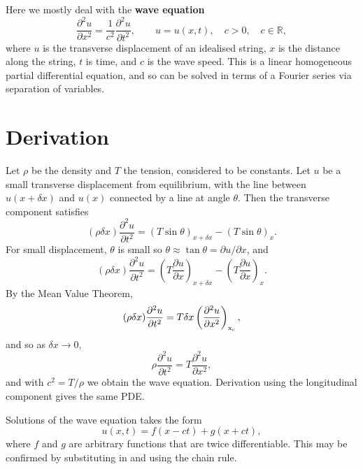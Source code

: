 \documentclass[letter-paper]{tufte-book}
\newcommand{\dy}{\partial}
\newcommand{\ddy}[2]{\frac{\dy#1}{\dy#2}}
\newcommand\Def[1]{\textbf{#1}}
\begin{document}
Here we mostly deal with the \Def{wave equation}
\begin{equation*}
  \ddy{^2 u}{x^2} = \frac{1}{c^2} \ddy{^2 u}{t^2}, 
    \qquad u = u(x,t), \quad c > 0, \quad c \in \mathbb{R},
\end{equation*}
where $u$ is the transverse displacement of an idealised string, $x$ is the
distance along the string, $t$ is time, and $c$ is the wave speed. This is a
linear homogeneous partial differential equation, and so can be solved in terms
of a Fourier series via separation of variables.


\section{Derivation}

Let $\rho$ be the density and $T$ the tension, considered to be constants. Let
$u$ be a small transverse displacement from equilibrium, with the line between
$u(x + \delta x)$ and $u(x)$ connected by a line at angle $\theta$. Then the
transverse component satisfies
\begin{equation*}
  (\rho \delta x) \ddy{^2 u}{t^2} = 
    (T \sin \theta)_{x + \delta x} - (T \sin \theta)_{x}.
\end{equation*}
For small displacement, $\theta$ is small so $\theta \approx \tan\theta = \dy u/
\dy x$, and
\begin{equation*}
  (\rho \delta x) \ddy{^2 u}{t^2} = (T \ddy{u}{x})_{x + \delta x} - (T \ddy{u}{x})_{x}.
\end{equation*}
By the Mean Value Theorem,
\begin{equation*}
  (\rho \delta x) \ddy{^2 u}{t^2} = T \delta x \left(\ddy{^2 u}{x^2} \right)_{\rm x_c},
\end{equation*}
and so as $\delta x \to 0$,
\begin{equation*}
  \rho \ddy{^2 u}{t^2} = T \ddy{^2 u}{x^2},
\end{equation*}
and with $c^2 = T / \rho$ we obtain the wave equation. Derivation using the
longitudinal component gives the same PDE.

Solutions of the wave equation takes the form
\begin{equation*}
  u(x,t) = f(x - ct) + g(x + ct),
\end{equation*}
where $f$ and $g$ are arbitrary functions that are twice differentiable. This may
be confirmed by substituting in and using the chain rule.
\end{document}
